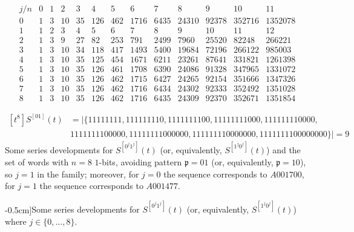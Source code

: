 \begin{table}
\begin{equation*}
\begin{array}{c|cccccccccccc}
    j/n & 0 & 1 & 2 & 3 & 4 & 5 & 6 & 7 & 8 & 9 & 10 & 11\\\hline0 & 1 & 3 & 10 & 35 & 126 & 462 & 1716 & 6435 & 24310 & 92378 & 352716 & 1352078\\1 & 1 & 2 & 3 & 4 & 5 & 6 & 7 & 8 & 9 & 10 & 11 & 12\\2 & 1 & 3 & 9 & 27 & 82 & 253 & 791 & 2499 & 7960 & 25520 & 82248 & 266221\\3 & 1 & 3 & 10 & 34 & 118 & 417 & 1493 & 5400 & 19684 & 72196 & 266122 & 985003\\4 & 1 & 3 & 10 & 35 & 125 & 454 & 1671 & 6211 & 23261 & 87641 & 331821 & 1261398\\5 & 1 & 3 & 10 & 35 & 126 & 461 & 1708 & 6390 & 24086 & 91328 & 347965 & 1331072\\6 & 1 & 3 & 10 & 35 & 126 & 462 & 1715 & 6427 & 24265 & 92154 & 351666 & 1347326\\7 & 1 & 3 & 10 & 35 & 126 & 462 & 1716 & 6434 & 24302 & 92333 & 352492 & 1351028\\8 & 1 & 3 & 10 & 35 & 126 & 462 & 1716 & 6435 & 24309 & 92370 & 352671 & 1351854
\end{array}
\end{equation*}

\begin{displaymath}
    \begin{split}
    [t^{8}]S^{[01]}(t) &= \big|\lbrace 11111111, 111111110, 1111111100, 11111111000, 111111110000,\\
    & 1111111100000, 11111111000000, 111111110000000, 1111111100000000\rbrace\big| = 9
    \end{split}
\end{displaymath}
{Some series developments for $S^{[0^{j}1^j]}(t)$ (or, equivalently,
$S^{[1^{j}0^{j}]}(t)$) and the set of words with $n=8$ $1$-bits, avoiding
pattern $\mathfrak{p}=01$ (or, equivalently, $\mathfrak{p}=10$), so $j=1$ in
the family; moreover, for $j=0$ the sequence corresponds to $A001700$, for
$j=1$ the sequence corresponds to  $A001477$.}
\caption[][-0.5cm]{Some series developments for $S^{[0^{j}1^j]}(t)$ (or,
equivalently, $S^{[1^{j}0^{j}]}(t)$) where $j\in \lbrace 0,\ldots,8 \rbrace$.}
\label{tbl:S0_j:1_j}
\end{table}

